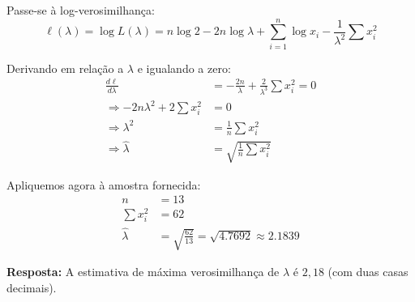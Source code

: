 \documentclass[a4paper,12pt]{article}
\begin{document}
\begin{enumerate}
\begin{mdframed}[backgroundcolor=gray!10, linewidth=0pt, innertopmargin=10pt, innerbottommargin=10pt]
    Passe-se à log-verosimilhança:
    \[
    \ell(\lambda) = \log L(\lambda) = n \log 2 - 2n \log \lambda + \sum_{i=1}^n \log x_i - \frac{1}{\lambda^2} \sum x_i^2
    \]

    Derivando em relação a \( \lambda \) e igualando a zero:
    \begin{align*}
    \frac{d\ell}{d\lambda} &= -\frac{2n}{\lambda} + \frac{2}{\lambda^3} \sum x_i^2 = 0 \\
    \Rightarrow -2n\lambda^2 + 2 \sum x_i^2 &= 0 \\
    \Rightarrow \lambda^2 &= \frac{1}{n} \sum x_i^2 \\
    \Rightarrow \hat{\lambda} &= \sqrt{ \frac{1}{n} \sum x_i^2 }
    \end{align*}

    Apliquemos agora à amostra fornecida:
    \begin{align*}
    n &= 13 \\
    \sum x_i^2 &= 62 \\
    \hat{\lambda} &= \sqrt{ \frac{62}{13} } = \sqrt{4.7692} \approx 2.1839
    \end{align*}

    \textbf{Resposta:} A estimativa de máxima verosimilhança de \( \lambda \) é \( 2{,}18 \) (com duas casas decimais).
    \end{mdframed}


    
\end{enumerate}
\end{document}

